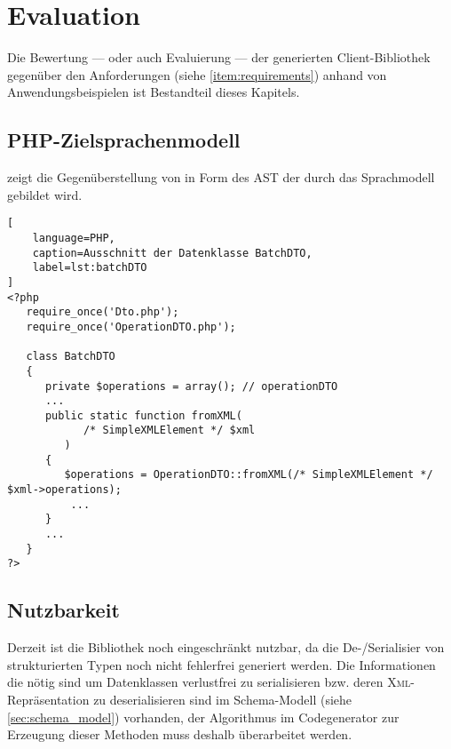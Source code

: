 \chapter{Evaluation}
\label{chap:evaluation}


Die Bewertung --- oder auch Evaluierung --- der generierten Client-Bibliothek gegenüber den Anforderungen (siehe \cref{item:requirements}) anhand von Anwendungsbeispielen ist Bestandteil dieses Kapitels.

\section{PHP-Zielsprachenmodell}
\label{sec:php_target_language_model}

 zeigt die Gegenüberstellung von  in Form des \gls{AST} der durch das Sprachmodell gebildet wird. 

\begin{lstlisting}[
    language=PHP,
    caption=Ausschnitt der Datenklasse BatchDTO,
    label=lst:batchDTO
]
<?php
   require_once('Dto.php');
   require_once('OperationDTO.php');

   class BatchDTO
   {
      private $operations = array(); // operationDTO 
      ...
      public static function fromXML(
            /* SimpleXMLElement */ $xml
         )
      {
         $operations = OperationDTO::fromXML(/* SimpleXMLElement */ $xml->operations);
          ...
      }
      ...
   }
?>
\end{lstlisting}

\begin{sidewaysfigure}
    \centering
    \resizebox{1.0\textheight}{!}{
      
    }
    \caption{Darstellung von BatchDTO aus  im Sprachenmodell}
    \label{fig:modelRepresentationOfBatchDTO}
\end{sidewaysfigure}

\section{Nutzbarkeit}
\label{sec:usability}

Derzeit ist die Bibliothek noch eingeschränkt nutzbar, da die De-/Serialisier von strukturierten Typen noch nicht fehlerfrei generiert werden. Die Informationen die nötig sind um Datenklassen verlustfrei zu serialisieren bzw. deren \textsc{Xml}-Repräsentation zu deserialisieren sind im Schema-Modell (siehe \cref{sec:schema_model}) vorhanden, der Algorithmus im Codegenerator zur Erzeugung dieser Methoden muss deshalb überarbeitet werden.

